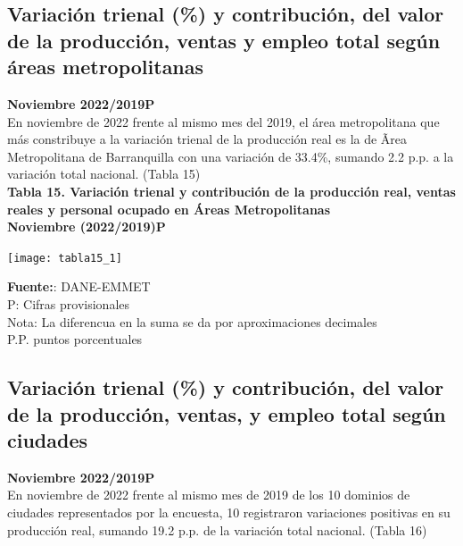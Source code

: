 \documentclass[
]{article}
\begin{document}
\hypertarget{variaciuxf3n-trienal-y-contribuciuxf3n-del-valor-de-la-producciuxf3n-ventas-y-empleo-total-seguxfan-uxe1reas-metropolitanas}{%
\subsection{Variación trienal (\%) y contribución, del valor de la
producción, ventas y empleo total según áreas
metropolitanas}\label{variaciuxf3n-trienal-y-contribuciuxf3n-del-valor-de-la-producciuxf3n-ventas-y-empleo-total-seguxfan-uxe1reas-metropolitanas}}

\textbf{Noviembre 2022/2019P}\\

En noviembre de 2022 frente al mismo mes del 2019, el área metropolitana
que más constribuye a la variación trienal de la producción real es la
de Ãrea Metropolitana de Barranquilla con una variación de 33.4\%,
sumando 2.2 p.p. a la variación total nacional. (Tabla 15)\\

\textbf{Tabla 15. Variación trienal y contribución de la producción
real, ventas reales y personal ocupado en Áreas Metropolitanas}\\
\textbf{Noviembre (2022/2019)P}\\

\begin{center}\texttt{[image: tabla15\_1]} \end{center}

\textbf{Fuente:}: DANE-EMMET\\
P: Cifras provisionales\\
Nota: La diferencua en la suma se da por aproximaciones decimales\\
P.P. puntos porcentuales\\

\hypertarget{variaciuxf3n-trienal-y-contribuciuxf3n-del-valor-de-la-producciuxf3n-ventas-y-empleo-total-seguxfan-ciudades}{%
\subsection{Variación trienal (\%) y contribución, del valor de la
producción, ventas, y empleo total según
ciudades}\label{variaciuxf3n-trienal-y-contribuciuxf3n-del-valor-de-la-producciuxf3n-ventas-y-empleo-total-seguxfan-ciudades}}

\textbf{Noviembre 2022/2019P}\\

En noviembre de 2022 frente al mismo mes de 2019 de los 10 dominios de
ciudades representados por la encuesta, 10 registraron variaciones
positivas en su producción real, sumando 19.2 p.p. de la variación total
nacional. (Tabla 16)\\
\end{document}
